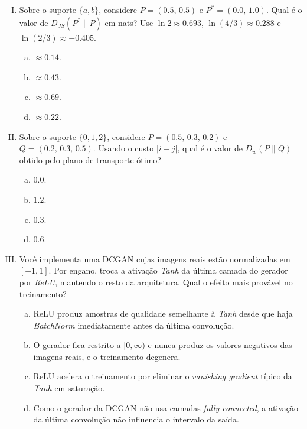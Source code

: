 \documentclass{dlproblemset}
\begin{document}
\begin{enumerate}[I)]
\item Sobre o suporte $\{a, b\}$, considere $P = (0.5,\, 0.5)$ e $P^{*} = (0.0,\, 1.0)$. Qual é o valor de $D_{JS}(P^{*}\|P)$ em nats? Use $\ln 2 \approx 0.693$, $\ln(4/3) \approx 0.288$ e $\ln(2/3) \approx -0.405$.
\begin{enumerate}[(a)]
    \item $\approx 0.14$.
    \item $\approx 0.43$.
    \item $\approx 0.69$.
    \item $\approx 0.22$.
\end{enumerate}

\item Sobre o suporte $\{0, 1, 2\}$, considere $P = (0.5,\, 0.3,\, 0.2)$ e $Q = (0.2,\, 0.3,\, 0.5)$. Usando o custo $|i - j|$, qual é o valor de $D_{w}(P\|Q)$ obtido pelo plano de transporte ótimo?
\begin{enumerate}[(a)]
    \item $0.0$.
    \item $1.2$.
    \item $0.3$.
    \item $0.6$.
\end{enumerate}

\item Você implementa uma DCGAN cujas imagens reais estão normalizadas em $[-1, 1]$. Por engano, troca a ativação \emph{Tanh} da última camada do gerador por \emph{ReLU}, mantendo o resto da arquitetura. Qual o efeito mais provável no treinamento?
\begin{enumerate}[(a)]
    \item ReLU produz amostras de qualidade semelhante à \emph{Tanh} desde que haja \emph{BatchNorm} imediatamente antes da última convolução.
    \item O gerador fica restrito a $[0, \infty)$ e nunca produz os valores negativos das imagens reais, e o treinamento degenera.
    \item ReLU acelera o treinamento por eliminar o \emph{vanishing gradient} típico da \emph{Tanh} em saturação.
    \item Como o gerador da DCGAN não usa camadas \emph{fully connected}, a ativação da última convolução não influencia o intervalo da saída.
\end{enumerate}


\end{enumerate}
\end{document}
